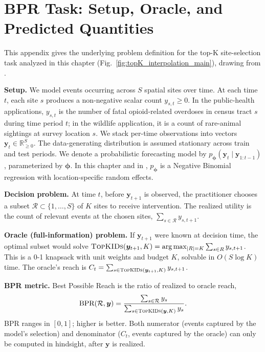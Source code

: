 \section{BPR Task: Setup, Oracle, and Predicted Quantities}
\label{app:bpr_setup}

This appendix gives the underlying problem definition for the top-K site-selection task analyzed in this chapter (Fig.~\ref{fig:topK_interpolation_main}), drawing from \citet{heuton2025decisionaware}.

\textbf{Setup.} We model events occurring across $S$ spatial sites over time. At each time $t$, each site $s$ produces a non-negative scalar count $y_{s,t} \geq 0$. In the public-health applications, $y_{s,t}$ is the number of fatal opioid-related overdoses in census tract $s$ during time period $t$; in the wildlife application, it is a count of rare-animal sightings at survey location $s$. We stack per-time observations into vectors $\bm{y}_t \in \mathbb{R}_{\geq 0}^S$. The data-generating distribution is assumed stationary across train and test periods. We denote a probabilistic forecasting model by $p_{\bm{\phi}}(\bm{y}_t \mid \bm{y}_{1:t-1})$, parameterized by $\bm{\phi}$. In this chapter and in \citet{heuton2025decisionaware}, $p_{\bm{\phi}}$ is a Negative Binomial regression with location-specific random effects.

\textbf{Decision problem.} At time $t$, before $\bm{y}_{t+1}$ is observed, the practitioner chooses a subset $\mathcal{R} \subset \{1, \ldots, S\}$ of $K$ sites to receive intervention. The realized utility is the count of relevant events at the chosen sites, $\sum_{s \in \mathcal{R}} y_{s,t+1}$.

\textbf{Oracle (full-information) problem.} If $\bm{y}_{t+1}$ were known at decision time, the optimal subset would solve $\textsc{TopKIDs}(\bm{y}_{t+1}, K) = \arg\max_{|R|=K} \sum_{s \in R} y_{s, t+1}$. This is a 0-1 knapsack with unit weights and budget $K$, solvable in $O(S \log K)$ time. The oracle's reach is $C_t = \sum_{s \in \textsc{TopKIDs}(\bm{y}_{t+1}, K)} y_{s, t+1}$.

\textbf{BPR metric.} Best Possible Reach is the ratio of realized to oracle reach,
\begin{align}
\text{BPR}(\mathcal{R}, \bm{y}) = \frac{\sum_{s \in \mathcal{R}} y_s}{\sum_{s \in \textsc{TopKIDs}(\bm{y}, K)} y_s}.
\end{align}
BPR ranges in $[0, 1]$; higher is better. Both numerator (events captured by the model's selection) and denominator ($C_t$, events captured by the oracle) can only be computed in hindsight, after $\bm{y}$ is realized.

